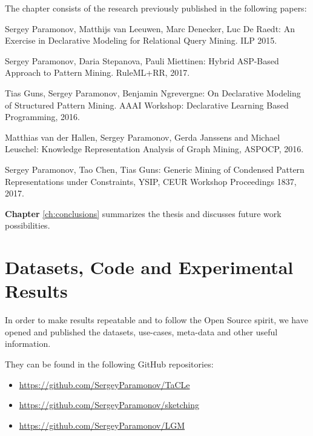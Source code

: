 The chapter consists of the research previously published in the following papers:
\begin{addmargin}[2em]{2em}
Sergey Paramonov, Matthijs van Leeuwen, Marc Denecker, Luc De Raedt:
An Exercise in Declarative Modeling for Relational Query Mining. ILP
2015.


Sergey Paramonov, Daria Stepanova, Pauli Miettinen:
Hybrid ASP-Based Approach to Pattern Mining. RuleML+RR, 2017.


Tias Guns, Sergey Paramonov, Benjamin Ngrevergne:  On Declarative Modeling of Structured Pattern Mining. AAAI Workshop:
  Declarative Learning Based Programming, 2016.

Matthias van der Hallen, Sergey Paramonov, Gerda Janssens and
  Michael Leuschel: Knowledge Representation Analysis of Graph
  Mining, ASPOCP, 2016.

Sergey Paramonov, Tao Chen, Tias Guns: Generic Mining of Condensed
Pattern Representations under Constraints, YSIP, CEUR Workshop
Proceedings 1837, 2017.

\end{addmargin}

\textbf{Chapter} \ref{ch:conclusions} summarizes the thesis and
discusses future work possibilities.

\section{Datasets, Code and Experimental Results}
In order to make results repeatable and to follow the Open Source
spirit, we have opened and published the datasets, use-cases,
meta-data and other useful information.

They can be found in the following GitHub repositories:
\begin{itemize}
\item \url{https://github.com/SergeyParamonov/TaCLe}
\item \url{https://github.com/SergeyParamonov/sketching}
\item \url{https://github.com/SergeyParamonov/LGM}
\end{itemize}
\cleardoublepage
